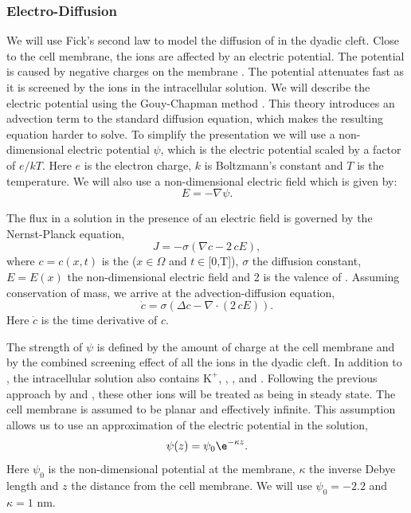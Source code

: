 \subsubsection*{Electro-Diffusion}
We will use Fick's second law to model the diffusion of \Ca in the dyadic cleft. Close to the cell membrane, the ions are affected by an electric potential. The potential is caused by negative charges on the membrane \cite{McLaughlinSzaboEtAl1971,LangnerCafisoEtAl1990}. The potential attenuates fast as it is screened by the ions in the intracellular solution. We will describe the electric potential using the Gouy-Chapman method \cite{Grahame1947}. This theory introduces an advection term to the standard diffusion equation, which makes the resulting equation harder to solve. To simplify the presentation we will use a non-dimensional electric potential $\psi$, which is the electric potential scaled by a factor of $e/kT$. Here $e$ is the electron charge, $k$ is Boltzmann's constant and $T$ is the temperature. We will also use a non-dimensional electric field which is given by:
\begin{equation}
  \label{eq:electric_field}
  E=-\nabla\psi.
\end{equation}

The \Ca flux in a solution in the presence of an electric field is governed by the Nernst-Planck equation,
\begin{equation}
  \label{eq:nernst-planck}
  J = -\sigma\left(\nabla c-2\,cE\right),
\end{equation}
where $c = c(x,t)$ is the \CaC ($x\in\Omega$ and $t\in$[0,T]), $\sigma$ the diffusion constant, $E = E(x)$ the non-dimensional electric field and 2 is the valence of \Ca. Assuming conservation of mass, we arrive at the advection-diffusion equation,
\begin{equation}
  \label{eq:advection-diffusion}
  \dot{c}=\sigma\left(\Delta c - \nabla\cdot\left(2\,cE\right)\right).
\end{equation}
Here $\dot{c}$ is the time derivative of $c$.\par

The strength of $\psi$ is defined by the amount of charge at the cell membrane and by the combined screening effect of all the ions in the dyadic cleft. In addition to \Ca, the intracellular solution also contains \ensuremath{\mbox{K}^{+}}, \Na, \Cl, and \Mg. Following the previous approach by \citet{LangnerCafisoEtAl1990} and \citet{SoellerCannell1997}, these other ions will be treated as being in steady state. The cell membrane is assumed to be planar and effectively infinite. This assumption allows us to use an approximation of the electric potential in the solution,
\begin{equation}
  \label{eq:electric_potential}
  \psi(z) = \psi_0\e^{-\kappa{}z}.
\end{equation}
Here $\psi_0$ is the non-dimensional potential at the membrane, $\kappa$ the inverse Debye length and $z$ the distance from the cell membrane. We will use $\psi_0=-2.2$ and $\kappa=1$ nm.\par

